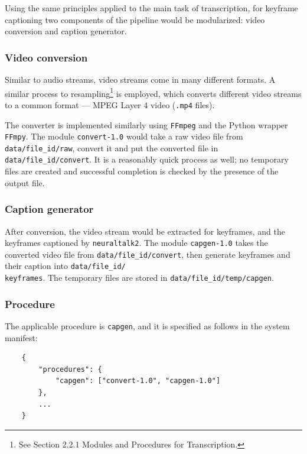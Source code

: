 Using the same principles applied to the main task of transcription, for keyframe captioning two components of the pipeline would be modularized: video conversion and caption generator.

\subsubsection{Video conversion}

Similar to audio streams, video streams come in many different formats. A similar process to resampling\footnote{See Section 2.2.1 Modules and Procedures for Transcription.} is employed, which converts different video streams to a common format --- MPEG Layer 4 video (\texttt{.mp4} files).

The converter is implemented similarly using \texttt{FFmpeg} and the Python wrapper \texttt{FFmpy}. The module \texttt{convert-1.0} would take a raw video file from \texttt{data/file\_id/raw}, convert it and put the converted file in \texttt{data/file\_id/convert}. It is a reasonably quick process as well; no temporary files are created and successful completion is checked by the presence of the output file.

\subsubsection{Caption generator}

After conversion, the video stream would be extracted for keyframes, and the keyframes captioned by \texttt{neuraltalk2}. The module \texttt{capgen-1.0} takes the converted video file from \texttt{data/file\_id/convert}, then generate keyframes and their caption into \texttt{data/file\_id/\\ keyframes}. The temporary files are stored in \texttt{data/file\_id/temp/capgen}.

\subsubsection{Procedure}

The applicable procedure is \texttt{capgen}, and it is specified as follows in the system manifest:

\begin{lstlisting}
    {
        "procedures": {
            "capgen": ["convert-1.0", "capgen-1.0"]
        },
        ...
    }
\end{lstlisting}